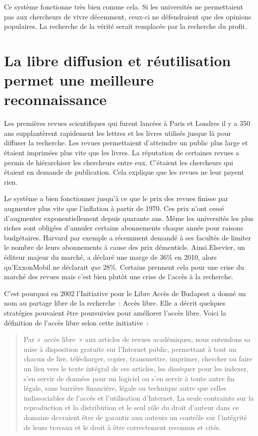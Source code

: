 Ce système fonctionne très bien comme cela. Si les universités ne permettaient pas aux chercheurs de vivre décemment, ceux-ci ne défendraient que des opinions populaires. La recherche de la vérité serait remplacée par la recherche du profit. 

\section{La libre diffusion et réutilisation permet une meilleure reconnaissance}
Les premières revues scientifiques qui furent lancées à Paris et Londres il y a 350 ans supplantèrent rapidement les lettres et les livres utilisés jusque là pour diffuser la recherche. Les revues permettaient d'atteindre un public plus large et étaient imprimées plus vite que les livres. La réputation de certaines revues a permis de hiérarchiser les chercheurs entre eux. C'étaient les chercheurs qui étaient en demande de publication. Cela explique que les revues ne leur payent rien. 

Le système a bien fonctionner jusqu'à ce que le prix des revues finisse par augmenter plus vite que l'inflation à partir de 1970. Ces prix n'ont cessé d'augmenter exponentiellement depuis quarante ans. Même les universités les plus riches sont obligées d'annuler certains abonnements chaque année pour raisons budgétaires. Harvard par exemple a récemment demandé à ses facultés de limiter le nombre de leurs abonnements à cause des prix démentiels. Ainsi Elsevier, un éditeur majeur du marché, a déclaré une marge de 36\% en 2010, alors qu'ExxonMobil ne déclarait \emph{que} 28\%.  Certains prennent cela pour une crise du marché des revues mais c'est bien plutôt une crise de l'accès à la recherche.

C'est pourquoi en 2002 l'Initiative pour le Libre Accès de Budapest a donné un nom au partage libre de la recherche~: Accès libre. Elle a décrit quelques stratégies pouvaient être poursuivies pour améliorer l'accès libre. Voici la définition de l'accès libre selon cette initiative~:


\begin{quotation}Par «~accès libre~» aux articles de revues académiques, nous entendons sa mise à disposition gratuite sur l'Internet public, permettant à tout un chacun de lire, télécharger, copier, transmettre, imprimer, chercher ou faire un lien vers le texte intégral de ces articles, les disséquer pour les indexer, s'en servir de données pour un logiciel ou s'en servir à toute autre fin légale, sans barrière financière, légale ou technique autre que celles indissociables de l'accès et l'utilisation d'Internet. La seule contrainte sur la reproduction et la distribution et le seul rôle du droit d'auteur dans ce domaine devraient être de garantir aux auteurs un contrôle sur l'intégrité de leurs travaux et le droit à être correctement reconnus et cités.
\end{quotation}

